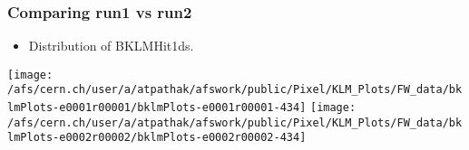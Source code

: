 \documentclass{beamer}
\begin{document}
\begin{frame}
\frametitle{Comparing run1 vs run2}
\vspace*{.05cm}

\begin{itemize} 
\item {\small Distribution of BKLMHit1ds.}
\end{itemize}

\begin{center}
\begin{normalsize}

\vspace*{-.2cm}
\begin{center}

\texttt{[image: /afs/cern.ch/user/a/atpathak/afswork/public/Pixel/KLM\_Plots/FW\_data/bklmPlots-e0001r00001/bklmPlots-e0001r00001-434]}
\texttt{[image: /afs/cern.ch/user/a/atpathak/afswork/public/Pixel/KLM\_Plots/FW\_data/bklmPlots-e0002r00002/bklmPlots-e0002r00002-434]} \\

\end{center}
\end{normalsize}
\end{center}
\end{frame}
\end{document}
